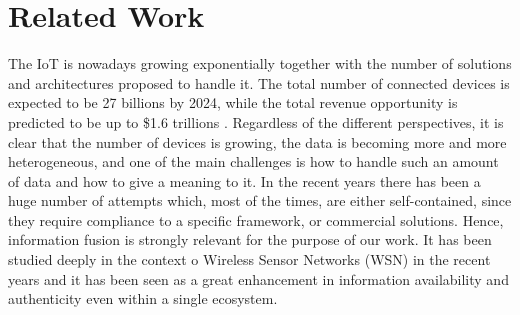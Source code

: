 \section{Related Work}
\label{sec:rel}

The IoT is nowadays growing exponentially together with the number of solutions and architectures proposed to handle it.
The total number of connected devices is expected to be 27 billions by 2024, while the total revenue opportunity is predicted to be up to \$1.6 trillions \cite{machina} .
Regardless of the different perspectives, it is clear that the number of devices is growing, the data is becoming more and more heterogeneous, and one of the main challenges is how to handle such an amount of data and how to give a meaning to it.
In the recent years there has been a huge number of attempts which, most of the times, are either self-contained, since they require compliance to a specific framework, or commercial solutions.
Hence, information fusion is strongly relevant for the purpose of our work.
It has been studied deeply in the context o Wireless Sensor Networks (WSN) in the recent years and it has been seen as a great enhancement in information availability and authenticity \cite{Khaleghi2013} even within a single ecosystem. 
\\

